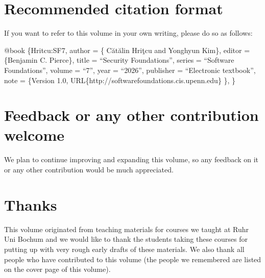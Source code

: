\documentclass[12pt]{report}
\begin{document}
\section{Recommended citation format}



 If you want to refer to this volume in your own writing,
    please do so as follows:


    @book            \{Hritcu:SF7,
    author       =   \{  Cătălin Hriţcu and
  Yonghyun Kim\},
    editor       =   \{Benjamin C. Pierce\},
    title        =   ``Security Foundations'',
    series       =   ``Software Foundations'',
    volume       =   ``7'',
    year         =   ``2026'',
    publisher    =   ``Electronic textbook'',
    note         =   \{Version 1.0,
                      URL\{http://softwarefoundations.cis.upenn.edu\} \},
    \}

\begin{coqdoccode}
\coqdocemptyline
\end{coqdoccode}
\section{Feedback or any other contribution welcome}



 We plan to continue improving and expanding this volume, so any feedback on
    it or any other contribution would be much appreciated. 
\begin{coqdoccode}
\coqdocemptyline
\end{coqdoccode}
\section{Thanks}



 This volume originated from teaching materials for courses we taught at Ruhr
    Uni Bochum and we would like to thank the students taking these courses for
    putting up with very rough early drafts of these materials.  We also thank
    all people who have contributed to this volume (the people we remembered are
    listed on the cover page of this volume).  
\begin{coqdoccode}
\coqdocemptyline
\end{coqdoccode}
\end{document}
